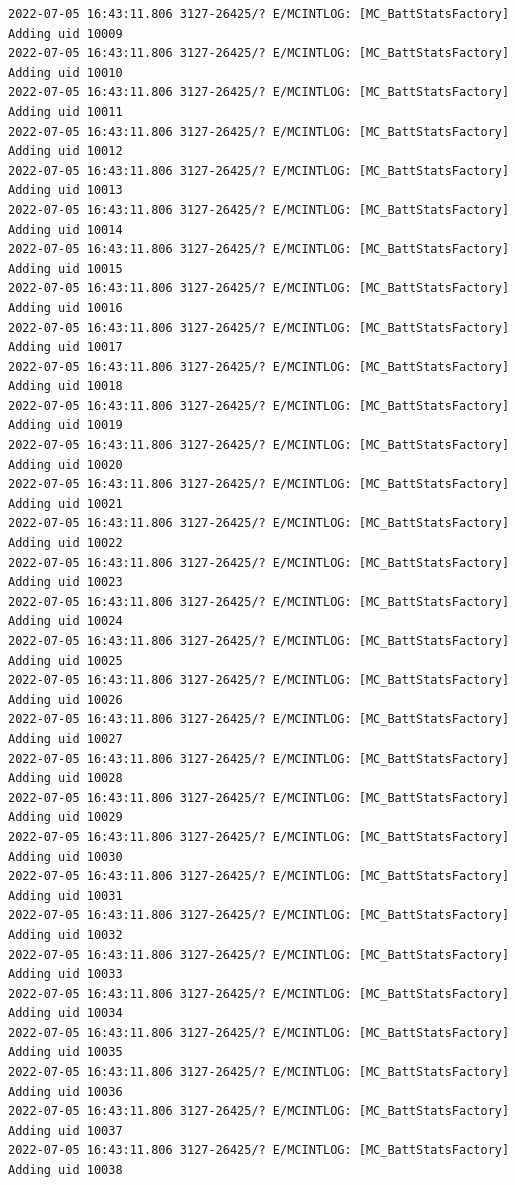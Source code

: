 \documentclass[a4paper,12pt]{book}
\begin{document}
\begin{lstlisting}
2022-07-05 16:43:11.806 3127-26425/? E/MCINTLOG: [MC_BattStatsFactory] Adding uid 10009
2022-07-05 16:43:11.806 3127-26425/? E/MCINTLOG: [MC_BattStatsFactory] Adding uid 10010
2022-07-05 16:43:11.806 3127-26425/? E/MCINTLOG: [MC_BattStatsFactory] Adding uid 10011
2022-07-05 16:43:11.806 3127-26425/? E/MCINTLOG: [MC_BattStatsFactory] Adding uid 10012
2022-07-05 16:43:11.806 3127-26425/? E/MCINTLOG: [MC_BattStatsFactory] Adding uid 10013
2022-07-05 16:43:11.806 3127-26425/? E/MCINTLOG: [MC_BattStatsFactory] Adding uid 10014
2022-07-05 16:43:11.806 3127-26425/? E/MCINTLOG: [MC_BattStatsFactory] Adding uid 10015
2022-07-05 16:43:11.806 3127-26425/? E/MCINTLOG: [MC_BattStatsFactory] Adding uid 10016
2022-07-05 16:43:11.806 3127-26425/? E/MCINTLOG: [MC_BattStatsFactory] Adding uid 10017
2022-07-05 16:43:11.806 3127-26425/? E/MCINTLOG: [MC_BattStatsFactory] Adding uid 10018
2022-07-05 16:43:11.806 3127-26425/? E/MCINTLOG: [MC_BattStatsFactory] Adding uid 10019
2022-07-05 16:43:11.806 3127-26425/? E/MCINTLOG: [MC_BattStatsFactory] Adding uid 10020
2022-07-05 16:43:11.806 3127-26425/? E/MCINTLOG: [MC_BattStatsFactory] Adding uid 10021
2022-07-05 16:43:11.806 3127-26425/? E/MCINTLOG: [MC_BattStatsFactory] Adding uid 10022
2022-07-05 16:43:11.806 3127-26425/? E/MCINTLOG: [MC_BattStatsFactory] Adding uid 10023
2022-07-05 16:43:11.806 3127-26425/? E/MCINTLOG: [MC_BattStatsFactory] Adding uid 10024
2022-07-05 16:43:11.806 3127-26425/? E/MCINTLOG: [MC_BattStatsFactory] Adding uid 10025
2022-07-05 16:43:11.806 3127-26425/? E/MCINTLOG: [MC_BattStatsFactory] Adding uid 10026
2022-07-05 16:43:11.806 3127-26425/? E/MCINTLOG: [MC_BattStatsFactory] Adding uid 10027
2022-07-05 16:43:11.806 3127-26425/? E/MCINTLOG: [MC_BattStatsFactory] Adding uid 10028
2022-07-05 16:43:11.806 3127-26425/? E/MCINTLOG: [MC_BattStatsFactory] Adding uid 10029
2022-07-05 16:43:11.806 3127-26425/? E/MCINTLOG: [MC_BattStatsFactory] Adding uid 10030
2022-07-05 16:43:11.806 3127-26425/? E/MCINTLOG: [MC_BattStatsFactory] Adding uid 10031
2022-07-05 16:43:11.806 3127-26425/? E/MCINTLOG: [MC_BattStatsFactory] Adding uid 10032
2022-07-05 16:43:11.806 3127-26425/? E/MCINTLOG: [MC_BattStatsFactory] Adding uid 10033
2022-07-05 16:43:11.806 3127-26425/? E/MCINTLOG: [MC_BattStatsFactory] Adding uid 10034
2022-07-05 16:43:11.806 3127-26425/? E/MCINTLOG: [MC_BattStatsFactory] Adding uid 10035
2022-07-05 16:43:11.806 3127-26425/? E/MCINTLOG: [MC_BattStatsFactory] Adding uid 10036
2022-07-05 16:43:11.806 3127-26425/? E/MCINTLOG: [MC_BattStatsFactory] Adding uid 10037
2022-07-05 16:43:11.806 3127-26425/? E/MCINTLOG: [MC_BattStatsFactory] Adding uid 10038

\end{lstlisting}
\end{document}
